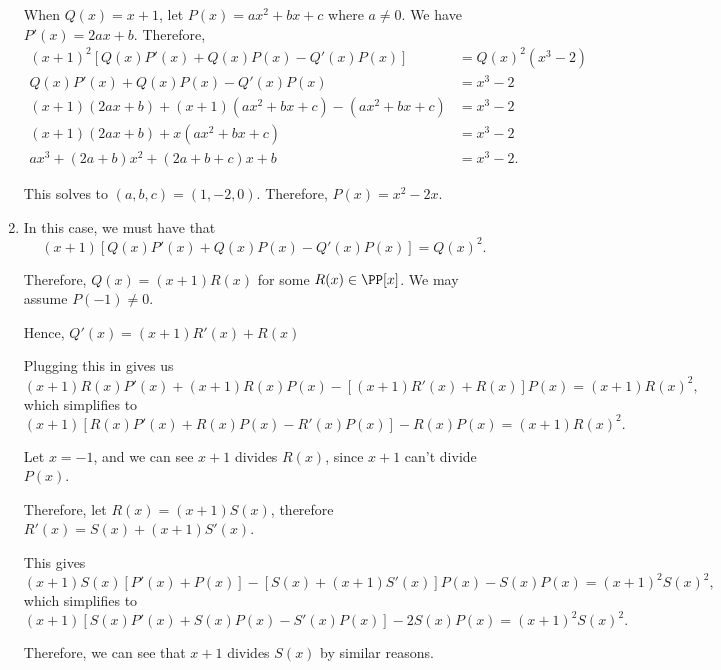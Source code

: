 \begin{enumerate}
          When \(Q(x) = x + 1\), let \(P(x) = ax^2 + bx + c\) where \(a \neq 0\). We have \(P'(x) = 2ax + b\). Therefore,
          \begin{align*}
              (x+1)^2 \left[Q(x)P'(x) + Q(x)P(x) - Q'(x)P(x)\right]       & = Q(x)^2 \left(x^3 - 2\right) \\
              Q(x)P'(x) + Q(x)P(x) - Q'(x)P(x)                            & = x^3 - 2                     \\
              (x + 1)(2ax + b) + (x + 1)(ax^2 + bx + c) - (ax^2 + bx + c) & = x^3 - 2                     \\
              (x + 1)(2ax + b) + x(ax^2 + bx + c)                         & = x^3 - 2                     \\
              ax^3 + (2a + b)x^2 + (2a + b + c)x + b                      & = x^3 - 2.
          \end{align*}

          This solves to \((a, b, c) = (1, -2, 0)\). Therefore, \(P(x) = x^2 - 2x\).

    \item In this case, we must have that
          \[
              (x + 1) \left[Q(x)P'(x) + Q(x)P(x) - Q'(x)P(x)\right] = Q(x)^2.
          \]

          Therefore, \(Q(x) = (x+1)R(x)\) for some \(R(x) \in \PP[x]\). We may assume \(P(-1) \neq 0\).

          Hence, \(Q'(x) = (x+1) R'(x) + R(x)\)

          Plugging this in gives us
          \[
              (x + 1)R(x) P'(x) + (x + 1)R(x) P(x) - \left[(x + 1) R'(x) + R(x)\right] P(x) = (x+1) R(x)^2,
          \]
          which simplifies to
          \[
              (x + 1)\left[R(x) P'(x) + R(x) P(x) - R'(x) P(x)\right] - R(x) P(x) = (x+1)R(x)^2.
          \]

          Let \(x = -1\), and we can see \(x + 1\) divides \(R(x)\), since \(x + 1\) can't divide \(P(x)\).

          Therefore, let \(R(x) = (x + 1) S(x)\), therefore \(R'(x) = S(x) + (x + 1) S'(x)\).

          This gives
          \[
              (x + 1) S(x) \left[P'(x) + P(x)\right] - \left[S(x) + (x + 1) S'(x)\right]P(x) - S(x) P(x) = (x + 1)^2 S(x)^2,
          \]
          which simplifies to
          \[
              (x + 1)\left[S(x) P'(x) + S(x) P(x) - S'(x) P(x)\right] - 2 S(x) P(x) = (x + 1)^2 S(x)^2.
          \]

          Therefore, we can see that \(x + 1\) divides \(S(x)\) by similar reasons.


\end{enumerate}
